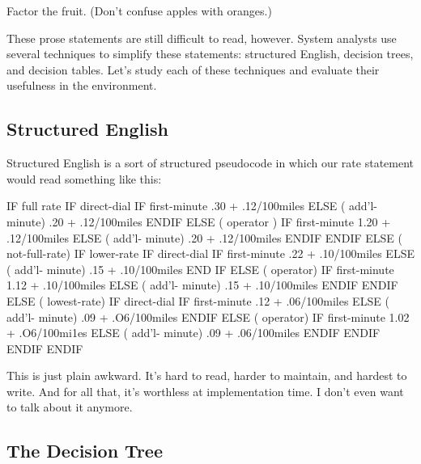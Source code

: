 \begin{tip}
Factor the fruit. (Don't confuse apples with oranges.)
\end{tip}
These prose statements are still difficult to read, however. System
analysts use several techniques to simplify these statements:
structured English, decision trees, and decision tables. Let's study
each of these techniques and evaluate their usefulness in the \Forth{}
environment.

\subsection{Structured English}

Structured English is a sort of structured pseudocode in which our rate
statement would read something like this:

\begin{Code}[baselinestretch=0.95]
IF full rate
   IF direct-dial
      IF first-minute
	 .30 + .12/100miles
      ELSE ( add'l- minute)
	 .20 + .12/100miles
      ENDIF
   ELSE ( operator )
      IF first-minute
	 1.20 + .12/100miles
      ELSE ( add'l- minute)
	 .20 + .12/100miles
      ENDIF
   ENDIF
ELSE  ( not-full-rate)
   IF lower-rate
      IF direct-dial
	 IF first-minute
	    .22 + .10/100miles
	 ELSE ( add'l- minute)
	    .15 + .10/100miles
	 END IF
      ELSE ( operator)
	 IF first-minute
	    1.12 + .10/100miles
	 ELSE ( add'l- minute)
	    .15 + .10/100miles
	 ENDIF
      ENDIF
   ELSE ( lowest-rate)
      IF direct-dial
	 IF first-minute
	    .12 + .06/100miles
	 ELSE ( add'l- minute)
	    .09 + .O6/100miles
	 ENDIF
      ELSE ( operator)
	 IF first-minute
	    1.02 + .O6/100mi1es
	 ELSE ( add'l- minute)
	    .09 + .06/100miles
	 ENDIF
      ENDIF
   ENDIF
ENDIF
\end{Code}
This is just plain awkward. It's hard to read, harder to maintain, and
hardest to write. And for all that, it's worthless at implementation
time. I don't even want to talk about it anymore.

\subsection{The Decision Tree}


